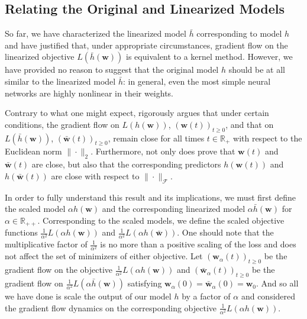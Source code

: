 \documentclass{article}
\begin{document}
\subsection{Relating the Original and Linearized Models}\label{kerneltheory}

So far, we have characterized the linearized model $\bar{h}$ corresponding to model $h$ and have justified that, under appropriate circumstances, gradient flow on the linearized objective $L(\bar{h}(\boldsymbol{w}))$ is equivalent to a kernel method. However, we have provided no reason to suggest that the original model $h$ should be at all similar to the linearized model $\bar{h}$: in general, even the most simple neural networks are highly nonlinear in their weights. 

Contrary to what one might expect, \cite{chizat2018lazy} rigorously argues that under certain conditions, the gradient flow on $L(h(\boldsymbol{w}))$, $(\boldsymbol{w}(t))_{t \geq 0}$, and that on $L(\bar{h}(\boldsymbol{w}))$, $(\boldsymbol{\bar{w}}(t))_{t \geq 0}$, remain close for all times $t \in \mathbb{R}_+$ with respect to the Euclidean norm $\| \cdot \|_2$. Furthermore, not only does \cite{chizat2018lazy} prove that $\boldsymbol{w}(t)$ and $\boldsymbol{\bar{w}}(t)$ are close, but also that the corresponding predictors $h(\boldsymbol{w}(t))$ and $h(\boldsymbol{\bar{w}}(t))$ are close with respect to $\| \cdot \|_{\mathcal{F}}$.

In order to fully understand this result and its implications, we must first define the scaled model $\alpha h(\boldsymbol{w})$ and the corresponding linearized model $\alpha \bar{h}(\boldsymbol{w})$ for $\alpha \in \mathbb{R}_{++}$. Corresponding to the scaled models, we define the scaled objective functions $\frac{1}{\alpha^2}L(\alpha h(\boldsymbol{w}))$ and $\frac{1}{\alpha^2}L(\alpha h(\boldsymbol{\bar{w}}))$. One should note that the multiplicative factor of $\frac{1}{\alpha^2}$ is no more than a positive scaling of the loss and does not affect the set of minimizers of either objective. Let $(\boldsymbol{w}_{\alpha}(t))_{t \geq 0}$ be the gradient flow on the objective $\frac{1}{\alpha^2}L(\alpha h(\boldsymbol{w}))$ and $(\boldsymbol{\bar{w}}_{\alpha}(t))_{t \geq 0}$ be the gradient flow on $\frac{1}{\alpha^2}L(\alpha \bar{h}(\boldsymbol{w}))$ satisfying $\boldsymbol{w}_{\alpha}(0) = \boldsymbol{\bar{w}}_{\alpha}(0) = \boldsymbol{w}_0$. And so all we have done is scale the output of our model $h$ by a factor of $\alpha$ and considered the gradient flow dynamics on the corresponding objective $\frac{1}{\alpha^2}L(\alpha h(\boldsymbol{w}))$.
\end{document}
